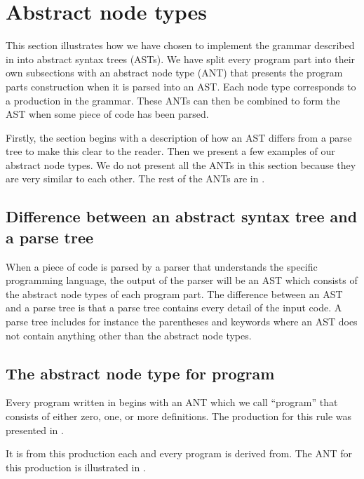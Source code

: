 \section{Abstract node types}
\label{sec:ant}

This section illustrates how we have chosen to implement the grammar described in
 into abstract syntax trees (ASTs). 
We have split every program part into their own subsections with an abstract
node type (ANT) that presents the program parts construction when it is parsed into an
AST. Each node type corresponds to a production in the grammar. These ANTs can
then be combined to form the AST when some piece of code has been parsed.

Firstly, the section begins with a description of how an AST differs from a parse tree 
to make this clear to the reader. Then we present a few examples of our abstract
node types. We do not present all the ANTs in this section because they are very
similar to each other. The rest of the ANTs are in .

\subsection{Difference between an abstract syntax tree and a parse tree}
When a piece of code is parsed by a parser that understands the specific programming 
language, the output of the parser will be an AST which consists of the abstract node 
types of each program part. The difference between an AST and a parse tree is that a 
parse tree contains every detail of the input code. A parse tree includes for instance
the parentheses and keywords where an AST does not contain anything other than the 
abstract node types.\cite{parsevsast}

\subsection{The abstract node type for program}
Every program written in \productname{} begins with an ANT which 
we call ``program'' that consists of either zero, one, or more definitions. The 
production for this rule was presented in .


It is from this production each and every program is derived from. The ANT for 
this production is illustrated in .

